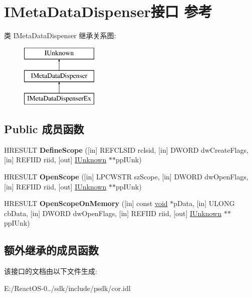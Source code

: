 \hypertarget{interface_i_meta_data_dispenser}{}\section{I\+Meta\+Data\+Dispenser接口 参考}
\label{interface_i_meta_data_dispenser}
类 I\+Meta\+Data\+Dispenser 继承关系图\+:\begin{figure}[H]
\begin{center}
\leavevmode
\includegraphics[height=3.000000cm]{interface_i_meta_data_dispenser}
\end{center}
\end{figure}
\subsection*{Public 成员函数}
\begin{DoxyCompactItemize}
\item 
\mbox{\label{interface_i_meta_data_dispenser_a3f06c09a5464c82b6f9675ba0fe7353a}} 
H\+R\+E\+S\+U\+LT {\bfseries Define\+Scope} (\mbox{[}in\mbox{]} R\+E\+F\+C\+L\+S\+ID rclsid, \mbox{[}in\mbox{]} D\+W\+O\+RD dw\+Create\+Flags, \mbox{[}in\mbox{]} R\+E\+F\+I\+ID riid, \mbox{[}out\mbox{]} \hyperlink{interface_i_unknown}{I\+Unknown} $\ast$$\ast$pp\+I\+Unk)
\item 
\mbox{\label{interface_i_meta_data_dispenser_a0bc2bbf739eabaa0d9a3611835f5a779}} 
H\+R\+E\+S\+U\+LT {\bfseries Open\+Scope} (\mbox{[}in\mbox{]} L\+P\+C\+W\+S\+TR sz\+Scope, \mbox{[}in\mbox{]} D\+W\+O\+RD dw\+Open\+Flags, \mbox{[}in\mbox{]} R\+E\+F\+I\+ID riid, \mbox{[}out\mbox{]} \hyperlink{interface_i_unknown}{I\+Unknown} $\ast$$\ast$pp\+I\+Unk)
\item 
\mbox{\label{interface_i_meta_data_dispenser_a24d8def782e66df2970934eae84dc290}} 
H\+R\+E\+S\+U\+LT {\bfseries Open\+Scope\+On\+Memory} (\mbox{[}in\mbox{]} const \hyperlink{interfacevoid}{void} $\ast$p\+Data, \mbox{[}in\mbox{]} U\+L\+O\+NG cb\+Data, \mbox{[}in\mbox{]} D\+W\+O\+RD dw\+Open\+Flags, \mbox{[}in\mbox{]} R\+E\+F\+I\+ID riid, \mbox{[}out\mbox{]} \hyperlink{interface_i_unknown}{I\+Unknown} $\ast$$\ast$pp\+I\+Unk)
\end{DoxyCompactItemize}
\subsection*{额外继承的成员函数}


该接口的文档由以下文件生成\+:\begin{DoxyCompactItemize}
\item 
E\+:/\+React\+O\+S-\/0../sdk/include/psdk/cor.\+idl\end{DoxyCompactItemize}
